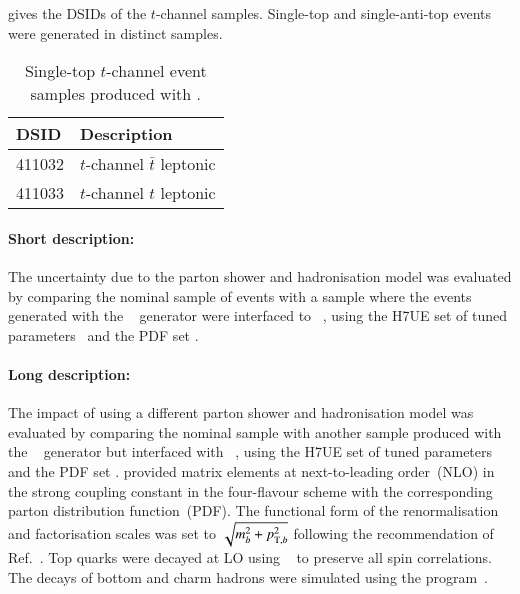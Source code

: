  gives the DSIDs of the \(t\)-channel \POWHER[7] samples.
Single-top and single-anti-top events were generated in distinct samples.

\begin{table}[htbp]
  \caption{Single-top \(t\)-channel event samples produced with \POWHER[7].}%
  \label{tab:tchan_PH7}
  \centering
  \begin{tabular}{l l}
    \toprule
    DSID & Description \\
    \midrule
    411032 & \(t\)-channel \(\bar t\) leptonic \\
    411033 & \(t\)-channel \(t\) leptonic \\
    \bottomrule
  \end{tabular}
\end{table}

\paragraph{Short description:}

The uncertainty due to the parton shower and hadronisation model was
evaluated by comparing the nominal sample of events with a sample where
the events generated with the
\POWHEGBOX[v2]~\cite{Frederix:2012dh,Nason:2004rx,Frixione:2007vw,Alioli:2010xd}
generator were interfaced to
\HERWIG[7.04]~\cite{Bahr:2008pv,Bellm:2015jjp}, using the H7UE set
of tuned parameters~\cite{Bellm:2015jjp} and the \MMHT[lo] PDF set
\cite{Harland-Lang:2014zoa}.


\paragraph{Long description:}

The impact of using a different parton shower and hadronisation model was evaluated by comparing the nominal sample
with another sample produced with the \POWHEGBOX[v2]~\cite{Frederix:2012dh,Nason:2004rx,Frixione:2007vw,Alioli:2010xd}
generator but interfaced with \HERWIG[7.04]~\cite{Bahr:2008pv,Bellm:2015jjp}, using the H7UE set of
tuned parameters~\cite{Bellm:2015jjp} and the \MMHT[lo] PDF set \cite{Harland-Lang:2014zoa}.
\POWHEGBOX provided matrix elements at next-to-leading order~(NLO) in the strong coupling constant \alphas
in the four-flavour scheme with the corresponding \NNPDF[3.0nlo]~\cite{Ball:2014uwa} parton distribution function~(PDF).
The functional form of the renormalisation and factorisation scales was set to \(\sqrt{m_b^2 + \pTX[2][b]}\)
following the recommendation of Ref.~\cite{Frederix:2012dh}.
Top quarks were decayed at LO using \MADSPIN~\cite{Frixione:2007zp,Artoisenet:2012st} to preserve all spin correlations.
The decays of bottom and charm hadrons were simulated using the \EVTGEN[1.6.0] program~\cite{Lange:2001uf}.


